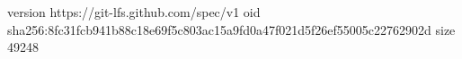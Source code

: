 version https://git-lfs.github.com/spec/v1
oid sha256:8fc31fcb941b88c18e69f5c803ac15a9fd0a47f021d5f26ef55005c22762902d
size 49248
